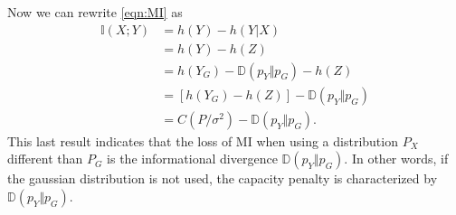 Now we can rewrite \ref{eqn:MI} as
\begin{align}
	\mathbb{I}(X;Y) &= h(Y) - h(Y \vert X)\\
	& = h(Y) - h(Z)\\
	& = h(Y_G) - \mathbb{D}(p_Y \Vert p_G) - h(Z)\\
	& = [h(Y_G) - h(Z)] - \mathbb{D}(p_Y \Vert p_G)\\
	& = C(P/\sigma^2) - \mathbb{D}(p_Y \Vert p_G).
\label{eq:C_minus_D}
\end{align}
This last result indicates that the loss of MI when using a distribution $P_X$ different than $P_G$ is the informational divergence $\mathbb{D}(p_Y \Vert p_G)$. In other words, if the gaussian distribution is not used, the capacity penalty is characterized by $\mathbb{D}(p_Y \Vert p_G)$.\\


